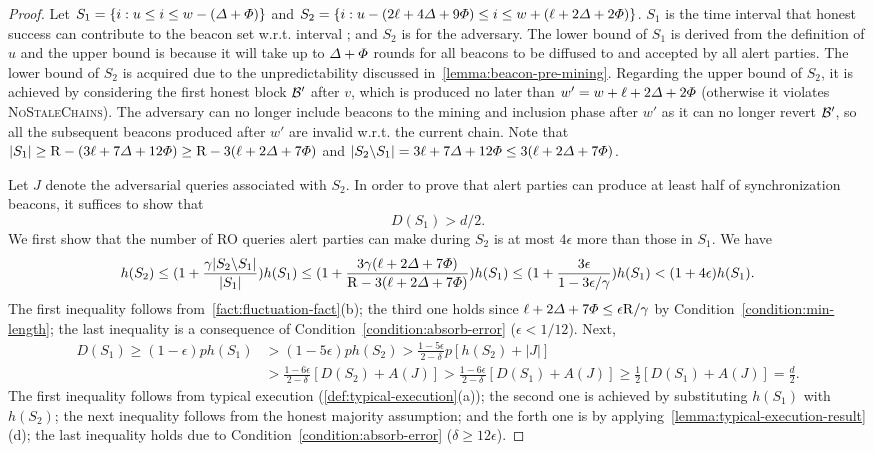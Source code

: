 \begin{proof}
    Let $S_1 = \{i : u \le i \le w - (\varDelta + \varPhi) \}$ and $S_2 = \{i :u - (2\ell + 4\varDelta + 9\varPhi) \le i \le w + (\ell + 2\varDelta + 2\varPhi) \}$.
    $S_1$ is the time interval that honest success can contribute to the beacon set w.r.t. interval \interval; and $S_2$ is for the adversary.
    The lower bound of $S_1$ is derived from the definition of $u$ and the upper bound is because it will take up to $\varDelta + \varPhi$ rounds for all beacons to be diffused to and accepted by all alert parties.
    The lower bound of $S_2$ is acquired due to the unpredictability discussed in~\cref{lemma:beacon-pre-mining}.
    Regarding the upper bound of $S_2$, it is achieved by considering the first honest block $\mathcal{B}'$ after $v$, which is produced no later than $w' = w + \ell + 2\varDelta + 2\varPhi$ (otherwise it violates \textsc{NoStaleChains}).
    The adversary can no longer include beacons to the mining and inclusion phase after $w'$ as it can no longer revert $\mathcal{B}'$, so all the subsequent beacons produced after $w'$ are invalid w.r.t. the current chain.
    Note that $|S_1| \ge \mathrm{R} - (3\ell + 7\varDelta + 12\varPhi) \ge \mathrm{R} - 3(\ell + 2\varDelta + 7\varPhi)$ and $|S_2 \backslash S_1| = 3\ell + 7\varDelta + 12\varPhi \le 3(\ell + 2\varDelta + 7\varPhi)$.

    Let $J$ denote the adversarial queries associated with $S_2$.
    In order to prove that alert parties can produce at least half of synchronization beacons, it suffices to show that
    \[ D(S_1) > d / 2. \]
    We first show that the number of RO queries alert parties can make during $S_2$ is at most $4\epsilon$ more than those in $S_1$.
    We have
    \[ h(S_2) \le (1 + \frac{\gamma |S_2 \backslash S_1| }{|S_1|}) h(S_1) \le (1 + \frac{3\gamma (\ell + 2\varDelta + 7\varPhi)}{\mathrm{R} - 3(\ell + 2\varDelta + 7\varPhi)}) h(S_1) \le (1 + \frac{3\epsilon}{1 - 3\epsilon / \gamma}) h(S_1) < (1 + 4\epsilon) h(S_1). \]
    The first inequality follows from~\cref{fact:fluctuation-fact}(b); the third one holds since $\ell + 2\varDelta + 7\varPhi \le \epsilon \mathrm{R} / \gamma$ by Condition~\eqref{condition:min-length}; the last inequality is a consequence of Condition~\eqref{condition:absorb-error} ($\epsilon < 1 / 12$).
    Next,
    \begin{align*}
        D(S_1) \ge (1 - \epsilon) p h(S_1) & > (1 - 5\epsilon) p h(S_2) > \frac{1 - 5\epsilon}{2 - \delta} p [h(S_2) + |J|]
        \\
                                           & > \frac{1 - 6\epsilon}{2 - \delta} [D(S_2) + A(J)] > \frac{1 - 6\epsilon}{2 - \delta} [D(S_1) + A(J)] \ge \frac{1}{2} [D(S_1) + A(J)] = \frac{d}{2}.
    \end{align*}
    The first inequality follows from typical execution (\cref{def:typical-execution}(a)); the second one is achieved by substituting $h(S_1)$ with $h(S_2)$; the next inequality follows from the honest majority assumption; and the forth one is by applying~\cref{lemma:typical-execution-result}(d); the last inequality holds due to Condition~\eqref{condition:absorb-error} ($\delta \ge 12 \epsilon$).
\end{proof}

